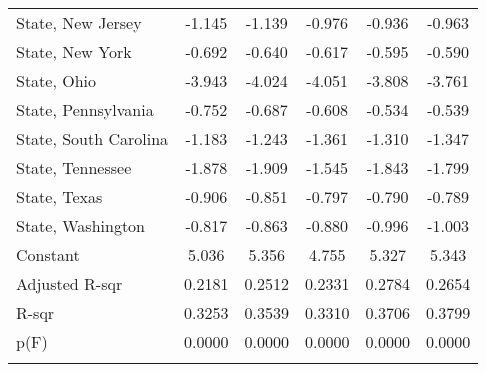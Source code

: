 {\begin{center}
{\begin{longtable}{l*{5}{c}}
\addlinespace
State, New Jersey        &      -1.145         &      -1.139         &      -0.976         &      -0.936         &      -0.963         \\
\addlinespace
State, New York          &      -0.692\sym{**} &      -0.640\sym{*}  &      -0.617\sym{*}  &      -0.595\sym{*}  &      -0.590\sym{*}  \\
\addlinespace
State, Ohio              &      -3.943\sym{***}&      -4.024\sym{***}&      -4.051\sym{***}&      -3.808\sym{***}&      -3.761\sym{***}\\
\addlinespace
State, Pennsylvania      &      -0.752         &      -0.687         &      -0.608         &      -0.534         &      -0.539         \\
\addlinespace
State, South Carolina    &      -1.183         &      -1.243         &      -1.361         &      -1.310         &      -1.347         \\
\addlinespace
State, Tennessee         &      -1.878\sym{**} &      -1.909\sym{**} &      -1.545\sym{*}  &      -1.843\sym{**} &      -1.799\sym{**} \\
\addlinespace
State, Texas             &      -0.906\sym{**} &      -0.851\sym{**} &      -0.797\sym{**} &      -0.790\sym{**} &      -0.789\sym{**} \\
\addlinespace
State, Washington        &      -0.817         &      -0.863\sym{*}  &      -0.880\sym{*}  &      -0.996\sym{**} &      -1.003\sym{**} \\


\addlinespace
Constant                 &       5.036\sym{***}&       5.356\sym{***}&       4.755\sym{***}&       5.327\sym{***}&       5.343\sym{***}\\
\midrule
Adjusted R-sqr           &      0.2181         &      0.2512         &      0.2331         &      0.2784         &      0.2654         \\
R-sqr                    &      0.3253         &      0.3539         &      0.3310         &      0.3706         &      0.3799         \\
p(F)                     &      0.0000         &      0.0000         &      0.0000         &      0.0000         &      0.0000         \\
\hline
\addlinespace
\multicolumn{6}{l}{\footnotesize \sym{*} \(p<0.10\), \sym{**} \(p<0.05\), \sym{***} \(p<.01\)}\\

\end{longtable}
}
\end{center}
}
